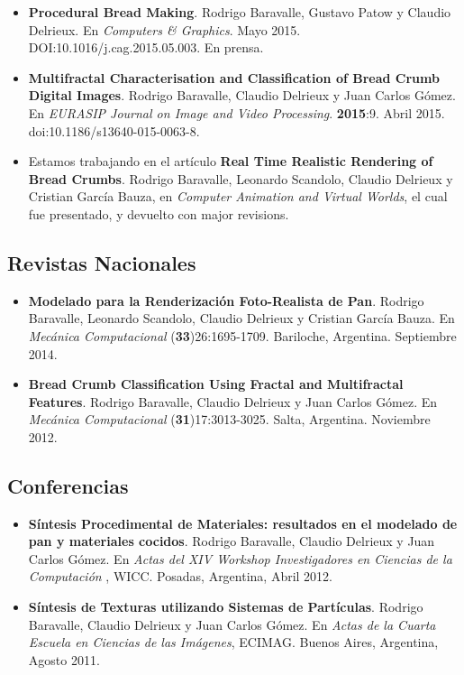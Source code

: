 \begin{itemize}
\item {\bf Procedural Bread Making}. Rodrigo Baravalle, Gustavo Patow y Claudio Delrieux. En {\it Computers \& Graphics}. Mayo 2015. DOI:10.1016/j.cag.2015.05.003.
En prensa.

\item {\bf Multifractal Characterisation and Classification of Bread Crumb Digital Images}. Rodrigo Baravalle, Claudio Delrieux y Juan Carlos Gómez. En {\it EURASIP Journal on Image and Video Processing}. {\bf 2015}:9. Abril 2015. doi:10.1186/s13640-015-0063-8.

\item Estamos trabajando en el artículo {\bf Real Time Realistic Rendering of Bread Crumbs}. Rodrigo Baravalle, Leonardo Scandolo, Claudio Delrieux y Cristian García Bauza, en {\it Computer Animation and Virtual Worlds}, el cual fue presentado, y devuelto con major revisions.
\end{itemize}


\subsection*{Revistas Nacionales}

\begin{itemize}
\item {\bf Modelado para la Renderización Foto-Realista de Pan}. Rodrigo Baravalle, Leonardo Scandolo, Claudio Delrieux y Cristian García Bauza. En {\it Mecánica Computacional} ({\bf 33})26:1695-1709. Bariloche, Argentina. Septiembre 2014.
\item {\bf Bread Crumb Classification Using Fractal and Multifractal Features}. Rodrigo Baravalle, Claudio Delrieux y Juan Carlos G\'omez. En {\it Mecánica Computacional} ({\bf 31})17:3013-3025. Salta, Argentina. Noviembre 2012.
\end{itemize}


\subsection*{Conferencias}
\begin{itemize}
\item {\bf Síntesis Procedimental de Materiales: resultados en el modelado de pan y materiales cocidos}. Rodrigo Baravalle, Claudio Delrieux y Juan Carlos G\'omez. En {\it Actas del XIV Workshop Investigadores en Ciencias de la Computación }, WICC. Posadas, Argentina, Abril 2012.
\item {\bf Síntesis de Texturas utilizando Sistemas de Partículas}. Rodrigo Baravalle, Claudio Delrieux y Juan Carlos G\'omez. En {\it Actas de la Cuarta Escuela en Ciencias de las Imágenes}, ECIMAG. Buenos Aires, Argentina, Agosto 2011.
\end{itemize}

